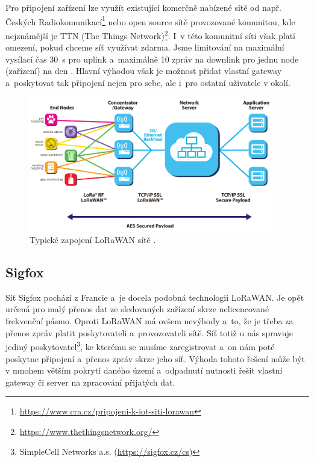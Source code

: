 Pro připojení zařízení lze využít existující komerčně nabízené sítě od např. Českých Radiokomunikací\footnote{\url{https://www.cra.cz/pripojeni-k-iot-siti-lorawan}} nebo open source sítě provozované komunitou, kde nejznámější je TTN (The Things Network)\footnote{\url{https://www.thethingsnetwork.org/}}. I~v této komunitní síti však platí omezení, pokud chceme síť využívat zdarma. Jsme limitování na maximální vysílací čas \SI{30}{\second} pro uplink a~maximálně 10 zpráv na downlink pro jednu node (zařízení) na den \cite{TTN_fair_use}. Hlavní výhodou však je možnost přidat vlastní gateway a~poskytovat tak připojení nejen pro sebe, ale i~pro ostatní uživatele v okolí.

\begin{figure}
    \centering
    \includegraphics[width=0.95\textwidth]{obrazky/lorawanNetwork.png}
    \caption[Typické zapojení LoRaWAN sítě.]{Typické zapojení LoRaWAN sítě \cite{LoRaWAN_pdf}.}
    \label{fig_LoRaWANNetwork}
\end{figure}

\subsection{Sigfox}

Síť Sigfox pochází z Francie a~je docela podobná technologii LoRaWAN. Je opět určená pro malý přenos dat ze sledovaných zařízení skrze nelicencované frekvenční pásmo. Oproti LoRaWAN má ovšem nevýhody a~to, že je třeba za přenos zpráv platit poskytovateli a~provozovateli sítě. Síť totiž u nás spravuje jediný poskytovatel\footnote{SimpleCell Networks a.s. (\url{https://sigfox.cz/cs})}, ke kterému se musíme zaregistrovat a~on nám poté poskytne připojení a~přenos zpráv skrze jeho síť. Výhoda tohoto řešení může být v mnohem větším pokrytí daného území a~odpadnutí nutnosti řešit vlastní gateway či server na zpracování přijatých dat.

